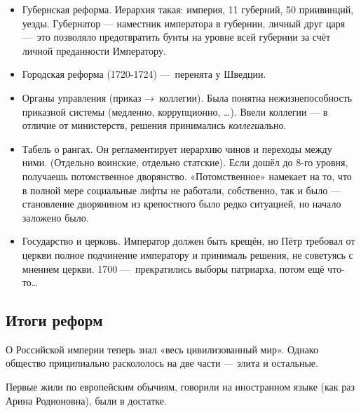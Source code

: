 \documentclass[12pt, a4paper]{article}
\begin{document}
\begin{itemize}
    \item Губернская реформа. Иерархия такая: империя, 11 губерний, 50 приивинций, уезды. 
    Губернатор — наместник императора в губернии, личный друг царя — это позволяло предотвратить бунты на уровне всей губернии за счёт личной преданности Императору. 

    \item Городская реформа (1720-1724) — перенята у Шведции.
    \item Органы управления (приказ → коллегии). Была понятна нежизнепособность приказной системы (медленно, коррупционно, …). 
    Ввели коллегии — в отличие от министерств, решения принимались \textit{коллеги}ально.

    \item Табель о рангах. Он регламентирует иерархию чинов и переходы между ними. (Отдельно воинские, отдельно статские). 
    Если дошёл до 8-го уровня, получаешь потомственное дворянство. 
    «Потомственное» намекает на то, что в полной мере социальные лифты не работали, собственно, 
    так и было — становление дворянином из крепостного было редко ситуацией, но начало заложено было.
    
    \item Государство и церковь. Император должен быть крещён, но Пётр требовал от церкви полное подчинение императору и принималь решения, не советуясь с мнением церкви.
    1700 — прекратились выборы патриарха, потом ещё что-то…
\end{itemize}

\subsection{Итоги реформ}

О Российской империи теперь знал «весь цивилизованный мир». 
Однако общество приципиально раскололось на две части — элита и остальные.

Первые жили по европейским обычиям, говорили на иностранном языке (как раз Арина Родионовна), были в достатке. 
\end{document}
